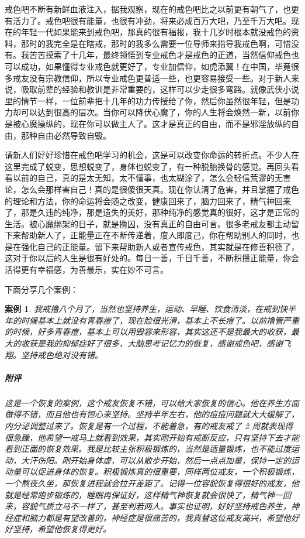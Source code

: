 \documentclass{ctexart}
\newtheorem{case}{案例}
\begin{document}
戒色吧不断有新鲜血液注入，据我观察，现在的戒色吧比之以前更有朝气了，也更有活力了。戒色吧很有能量，也很有冲劲，将来必成百万大吧，乃至千万大吧。现在的年轻一代如果能来到戒色吧，那真的很有福报，我十几岁时根本就没戒色的资料，那时的我完全是在瞎戒，那时的我多么需要一位导师来指导我戒色啊，可惜没有。我苦苦摸索了十几年，最终领悟到专业戒色才是戒色的正道，当然信仰戒色也可以成功，如果懂得专业戒色就更好了，专业加信仰，如虎添翼！在中国，毕竟很多戒友没有宗教信仰，所以专业戒色更普适一些，也更容易接受一些。对于新人来说，吸取前辈的经验和教训是非常重要的，这样可以少走很多弯路。就像武侠小说里的情节一样，一位前辈把十几年的功力传授给了你，然后你虽然很年轻，但是功力却可以达到很高的层次。当你可以降伏心魔了，你的人生将会焕然一新，以前你是被心魔操纵的，现在你可以做主人了。这才是真正的自由，而不是邪淫放纵的自由，那种自由必然导致自毁。

请新人们好好珍惜在戒色吧学习的机会，这是可以改变你命运的转折点。不少人在这里完成了蜕变，思想蜕变了，身体也蜕变了，有一种脱胎换骨的感觉。再回头看看以前的自己，真的是太无知，太不懂事，也太糊涂了，怎么会轻信荒谬的无害论，怎么会那样害自己！真的是很傻很天真。现在你认清了危害，并且掌握了戒色的理论和方法，你的命运将会随之改变，健康回来了，脑力回来了，精气神回来了，那是久违的纯净，那是遗失的美好，那种纯净的感觉真的很好，这才是正常的生活。被心魔绑架的日子，就是撸囚，没有真正的自由可言。很多老戒友都主动留下来帮助新人了，正能量正在不断传递着，度人即度己，你在帮助别人的同时，也是在强化自己的正能量。留下来帮助新人或者宣传戒色，其实就是在修善积德了，这对于你以后的人生是很有好处的。每日一善，千日千善，不断积攒正能量，你会活得更有幸福感，为善最乐，实在妙不可言。

下面分享几个案例：

\begin{case}
    我戒撸八个月了，当然也坚持养生，运动、早睡、饮食清淡，在戒到快半年的时候基本上就没有青春痘了，现在脸很光滑，基本上不长痘了。以前撸管严重的时候，好多青春痘，基本上可以用毁容来形容，其实这还不是我最大的收获，最大的收获是我的抑郁症好了很多，大脑思考记忆力的恢复，感谢戒色吧，感谢飞翔。坚持戒色绝对没有错。
    \subparagraph{附评} 这是一个恢复的案例，这个戒友恢复不错，可以给大家恢复的信心。他在养生方面做得不错，而且他也有恒心来坚持。坚持半年左右，他的痘痘问题就大大缓解了，内分泌调整过来了。恢复是有一个过程，不能着急，有的戒友戒了 2 周就表现得很急躁，他希望一戒马上就看到效果，其实刚开始有戒断反应，只有坚持下去才能看到正面的恢复效果。我是比较主张积极锻炼的，当然是适量锻炼，也不能过度运动，大汗伤阳。刚开始身体虚，可以从散步开始，然后一点点加量，保持一定的运动量可以促进身体的恢复。积极锻炼真的很重要，同样两位戒友，一个积极锻炼，一个熬夜久坐，那恢复进程就会拉开差距了。记得一位容貌恢复得很好的戒友，他就是经常跑步锻炼的，睡眠再保证好，这样精气神恢复就会很快了，精气神一回来，容貌气质立马不一样了，甚至判若两人。事实也证明，好好坚持戒色养生，神经症和脑力都是有望改善的，神经症是很痛苦的，我真替这位戒友高兴，希望他好好坚持，希望他恢复得更好。
\end{case}
\end{document}
